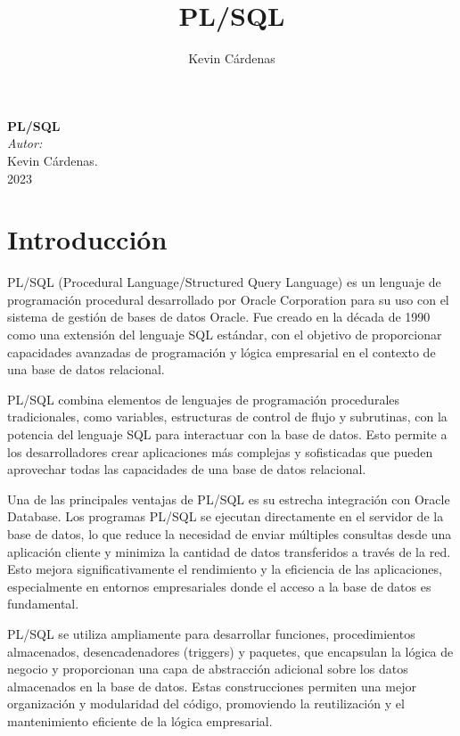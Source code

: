 \documentclass[executivepaper]{article}
\title{PL/SQL}
\author{Kevin Cárdenas}
\begin{document}
\begin{titlepage}
    \begin{center}
        {\Huge \textbf{PL/SQL}}
        \\[18cm]

        \large\emph{Autor:}\\
        Kevin Cárdenas.
        \\[1cm]
        {\large 2023}
    \end{center}
\end{titlepage}
\newpage
\tableofcontents
\newpage

\section{Introducción}
PL/SQL (Procedural Language/Structured Query Language) es un lenguaje de programación procedural desarrollado por Oracle Corporation para su uso con el sistema de gestión de bases de datos Oracle. Fue creado en la década de 1990 como una extensión del lenguaje SQL estándar, con el objetivo de proporcionar capacidades avanzadas de programación y lógica empresarial en el contexto de una base de datos relacional.

PL/SQL combina elementos de lenguajes de programación procedurales tradicionales, como variables, estructuras de control de flujo y subrutinas, con la potencia del lenguaje SQL para interactuar con la base de datos. Esto permite a los desarrolladores crear aplicaciones más complejas y sofisticadas que pueden aprovechar todas las capacidades de una base de datos relacional.

Una de las principales ventajas de PL/SQL es su estrecha integración con Oracle Database. Los programas PL/SQL se ejecutan directamente en el servidor de la base de datos, lo que reduce la necesidad de enviar múltiples consultas desde una aplicación cliente y minimiza la cantidad de datos transferidos a través de la red. Esto mejora significativamente el rendimiento y la eficiencia de las aplicaciones, especialmente en entornos empresariales donde el acceso a la base de datos es fundamental.

PL/SQL se utiliza ampliamente para desarrollar funciones, procedimientos almacenados, desencadenadores (triggers) y paquetes, que encapsulan la lógica de negocio y proporcionan una capa de abstracción adicional sobre los datos almacenados en la base de datos. Estas construcciones permiten una mejor organización y modularidad del código, promoviendo la reutilización y el mantenimiento eficiente de la lógica empresarial.
\end{document}
